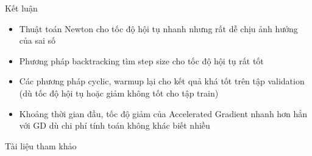 \documentclass[10pt]{beamer}
\theoremstyle{remark}
\theoremstyle{definition}
\begin{document}
\begin{frame}{Kết luận}
	\begin{itemize}
		\item Thuật toán Newton cho tốc độ hội tụ nhanh nhưng rất dễ chịu ảnh hưởng của sai số
  		\item Phương pháp backtracking tìm step size cho tốc độ hội tụ rất tốt
    	\item Các phương pháp cyclic, warmup lại cho kết quả khá tốt trên tập validation (dù tốc độ hội tụ hoặc giảm không tốt cho tập train)
     	\item Khoảng thời gian đầu, tốc độ giảm của Accelerated Gradient nhanh hơn hẳn với GD dù chi phí tính toán không khác biết nhiều
	\end{itemize}
\end{frame}

\begin{frame}[allowframebreaks]{Tài liệu tham khảo}
    \printbibliography
\end{frame}
\end{document}
